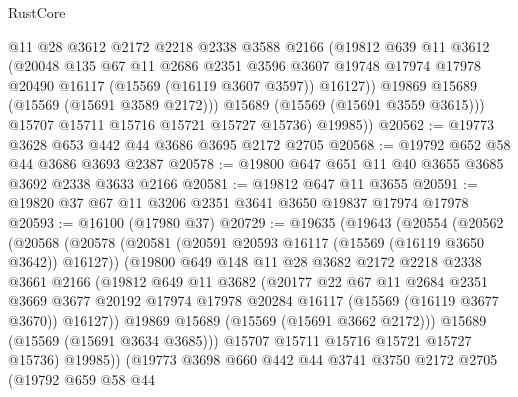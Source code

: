 \begin{lexlean}{RustCore}
\begin{coremodule}
              @11
              @28
              @3612
              @2172
              @2218
              @2338
              @3588
              @2166
              (@19812
                @639
                @11
                @3612
                (@20048
                  @135
                  @67
                  @11
                  @2686
                  @2351
                  @3596
                  @3607
                  @19748
                  @17974
                  @17978
                  @20490
                  @16117
                  (@15569 (@16119 @3607 @3597))
                  @16127))
              @19869
              @15689
              (@15569 (@15691 @3589 @2172)))
            @15689
            (@15569 (@15691 @3559 @3615)))
          @15707
          @15711
          @15716
          @15721
          @15727
          @15736)
        @19985))
@20562 := @19773 @3628 @653 @442 @44 @3686 @3695 @2172 @2705
@20568 := @19792 @652 @58 @44 @3686 @3693 @2387
@20578 := @19800 @647 @651 @11 @40 @3655 @3685 @3692 @2338 @3633 @2166
@20581 := @19812 @647 @11 @3655
@20591 := @19820 @37 @67 @11 @3206 @2351 @3641 @3650 @19837 @17974 @17978
@20593 := @16100 (@17980 @37)
@20729 := @19635
    (@19643
      (@20554
        (@20562
          (@20568
            (@20578
              (@20581 (@20591 @20593 @16117 (@15569 (@16119 @3650 @3642)) @16127))
              (@19800
                @649
                @148
                @11
                @28
                @3682
                @2172
                @2218
                @2338
                @3661
                @2166
                (@19812
                  @649
                  @11
                  @3682
                  (@20177
                    @22
                    @67
                    @11
                    @2684
                    @2351
                    @3669
                    @3677
                    @20192
                    @17974
                    @17978
                    @20284
                    @16117
                    (@15569 (@16119 @3677 @3670))
                    @16127))
                @19869
                @15689
                (@15569 (@15691 @3662 @2172)))
              @15689
              (@15569 (@15691 @3634 @3685)))
            @15707
            @15711
            @15716
            @15721
            @15727
            @15736)
          @19985))
      (@19773
        @3698
        @660
        @442
        @44
        @3741
        @3750
        @2172
        @2705
        (@19792
          @659
          @58
          @44

\end{coremodule}
\end{lexlean}
